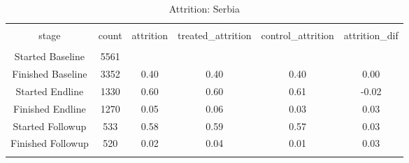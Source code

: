 
\begin{table}[H] \centering 
  \caption{Attrition: Serbia} 
  \label{tbl:Attrition: Serbia} 
\begin{tabular}{@{\extracolsep{5pt}} cccccc} 
\\[-1.8ex]\hline 
\hline \\[-1.8ex] 
stage & count & attrition & treated\_attrition & control\_attrition & attrition\_dif \\ 
\hline \\[-1.8ex] 
Started Baseline & 5561 &  &  &  &  \\ 
Finished Baseline & 3352 & 0.40 & 0.40 & 0.40 &  0.00 \\ 
Started Endline & 1330 & 0.60 & 0.60 & 0.61 & -0.02 \\ 
Finished Endline & 1270 & 0.05 & 0.06 & 0.03 &  0.03 \\ 
Started Followup &  533 & 0.58 & 0.59 & 0.57 &  0.03 \\ 
Finished Followup &  520 & 0.02 & 0.04 & 0.01 &  0.03 \\ 
\hline \\[-1.8ex] 
\end{tabular} 
\end{table} 
